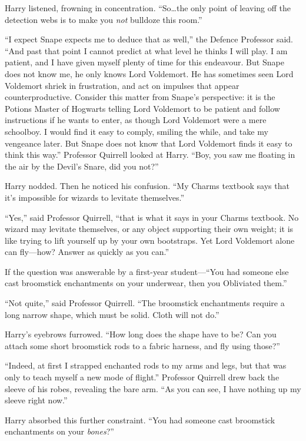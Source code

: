 Harry listened, frowning in concentration. “So…the only point of leaving off the detection webs is to make you \emph{not} bulldoze this room.”

“I expect Snape expects me to deduce that as well,” the Defence Professor said. “And past that point I cannot predict at what level he thinks I will play. I am patient, and I have given myself plenty of time for this endeavour. But Snape does not know me, he only knows Lord Voldemort. He has sometimes seen Lord Voldemort shriek in frustration, and act on impulses that appear counterproductive. Consider this matter from Snape’s perspective: it is the Potions Master of Hogwarts telling Lord Voldemort to be patient and follow instructions if he wants to enter, as though Lord Voldemort were a mere schoolboy. I would find it easy to comply, smiling the while, and take my vengeance later. But Snape does not know that Lord Voldemort finds it easy to think this way.” Professor Quirrell looked at Harry. “Boy, you saw me floating in the air by the Devil’s Snare, did you not?”

Harry nodded. Then he noticed his confusion. “My Charms textbook says that it’s impossible for wizards to levitate themselves.”

“Yes,” said Professor Quirrell, “that is what it says in your Charms textbook. No wizard may levitate themselves, or any object supporting their own weight; it is like trying to lift yourself up by your own bootstraps. Yet Lord Voldemort alone can fly—how? Answer as quickly as you can.”

If the question was answerable by a first-year student—“You had someone else cast broomstick enchantments on your underwear, then you Obliviated them.”

“Not quite,” said Professor Quirrell. “The broomstick enchantments require a long narrow shape, which must be solid. Cloth will not do.”

Harry’s eyebrows furrowed. “How long does the shape have to be? Can you attach some short broomstick rods to a fabric harness, and fly using those?”

“Indeed, at first I strapped enchanted rods to my arms and legs, but that was only to teach myself a new mode of flight.” Professor Quirrell drew back the sleeve of his robes, revealing the bare arm. “As you can see, I have nothing up my sleeve right now.”

Harry absorbed this further constraint. “You had someone cast broomstick enchantments on your \emph{bones}?”

